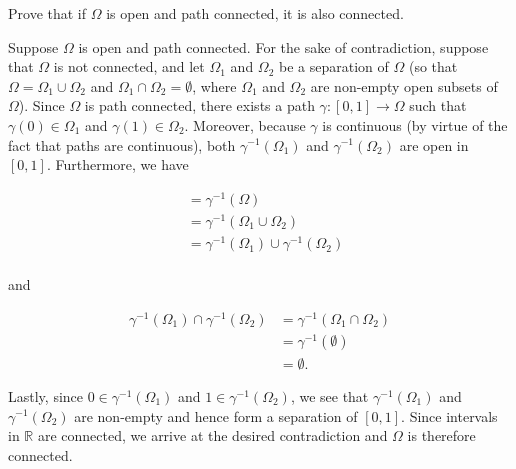 Prove that if $\Omega$ is open and path connected, it is also connected.

\begin{solution}
    Suppose $\Omega$ is open and path connected. For the sake of contradiction, suppose that $\Omega$ is not connected,
    and let $\Omega_1$ and $\Omega_2$ be a separation of $\Omega$ (so that $\Omega = \Omega_1 \cup \Omega_2$ and 
    $\Omega_1 \cap \Omega_2 = \emptyset$, where $\Omega_1$ and $\Omega_2$ are non-empty open subsets of $\Omega$). Since
    $\Omega$ is path connected, there exists a path $\gamma : [0, 1] \to \Omega$ such that $\gamma(0) \in \Omega_1$ and 
    $\gamma(1) \in \Omega_2$. Moreover, because $\gamma$ is continuous (by virtue of the fact that paths are 
    continuous), both $\gamma^{-1}(\Omega_1)$ and $\gamma^{-1}(\Omega_2)$ are open in $[0, 1]$. Furthermore, we have

    \begin{align*}
    [0, 1] &= \gamma^{-1}( \Omega ) \\
           &= \gamma^{-1}( \Omega_1 \cup \Omega_2 ) \\
           &= \gamma^{-1}( \Omega_1 ) \cup \gamma^{-1}( \Omega_2 ) \\
    \end{align*}

    and

    \begin{align*}
        \gamma^{-1}( \Omega_1 ) \cap \gamma^{-1}( \Omega_2 ) &= \gamma^{-1}( \Omega_1 \cap \Omega_2 ) \\
                                                             &= \gamma^{-1}( \emptyset ) \\
                                                             &= \emptyset.
    \end{align*}

    Lastly, since $0 \in \gamma^{-1}( \Omega_1 )$ and $1 \in \gamma^{-1}( \Omega_2 )$, we see that 
    $\gamma^{-1}(\Omega_1)$ and $\gamma^{-1}(\Omega_2)$ are non-empty and hence form a separation of $[0, 1]$. 
    Since intervals in $\mathbb{R}$ are connected, we arrive at the desired contradiction and $\Omega$ is therefore
    connected.
    \ \\
\end{solution}